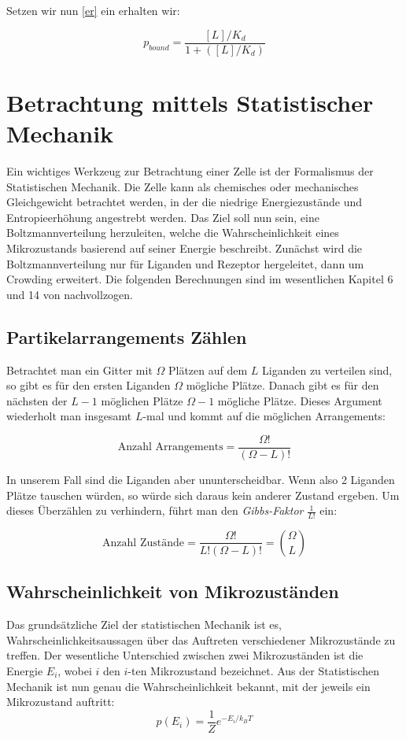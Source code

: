\documentclass[bachelor,       %
               twoside,        %
               BCOR10mm,       %
               english,ngerman, %
               ]{GAUBM}
\begin{document}
Setzen wir nun \ref{er} ein erhalten wir:

\begin{equation}
\label{pbounddiss}
p_{bound} = \frac{[L]/K_d}{1+([L]/K_d)}
\end{equation}



\section{Betrachtung mittels Statistischer Mechanik}
Ein wichtiges Werkzeug zur Betrachtung einer Zelle ist der Formalismus der
Statistischen Mechanik. Die Zelle kann als chemisches oder mechanisches Gleichgewicht
betrachtet werden, in der die niedrige Energiezustände und Entropieerhöhung angestrebt
werden. Das Ziel soll nun sein, eine Boltzmannverteilung herzuleiten, welche die
Wahrscheinlichkeit eines Mikrozustands basierend auf seiner Energie beschreibt.
Zunächst wird die Boltzmannverteilung nur für Liganden und Rezeptor hergeleitet,
dann um Crowding erweitert.
Die folgenden Berechnungen sind im wesentlichen Kapitel 6 und 14 von
\cite{phybio} nachvollzogen.

\subsection{Partikelarrangements Zählen}

Betrachtet man ein Gitter mit $\Omega$ Plätzen auf dem $L$ Liganden zu verteilen
sind, so gibt es für den ersten Liganden $\Omega$ mögliche Plätze. Danach gibt es
für den nächsten der $L - 1$ möglichen Plätze $\Omega - 1$ mögliche Plätze.
Dieses Argument wiederholt man insgesamt $L$-mal und kommt auf die möglichen Arrangements:

\begin{equation}
\text{Anzahl Arrangements} = \frac{\Omega!}{(\Omega-L)!}
\end{equation}

In unserem Fall sind die Liganden aber ununterscheidbar. Wenn also 2 Liganden
Plätze tauschen würden, so würde sich daraus kein anderer Zustand ergeben. Um
dieses Überzählen zu verhindern, führt man den \emph{Gibbs-Faktor} $\frac{1}{L!}$
ein:

\begin{equation}
\label{zustaende}
\text{Anzahl Zustände} = \frac{\Omega!}{L!(\Omega-L)!} = \binom{\Omega}{L}
\end{equation}

\subsection{Wahrscheinlichkeit von Mikrozuständen}
Das grundsätzliche Ziel der statistischen Mechanik ist es, Wahrscheinlichkeitsaussagen
über das Auftreten verschiedener Mikrozustände zu treffen. Der wesentliche Unterschied
zwischen zwei Mikrozuständen ist die Energie $E_i$, wobei $i$ den $i$-ten Mikrozustand
bezeichnet. Aus der Statistischen Mechanik ist nun genau die Wahrscheinlichkeit
bekannt, mit der jeweils ein Mikrozustand auftritt:
\begin{equation}
  \label{eq:boltzmann}
  p(E_i) = \frac{1}{Z} e^{-E_i/k_BT}
\end{equation}
\end{document}
